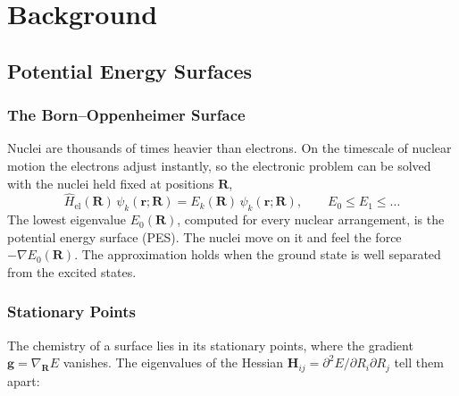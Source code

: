 %

\chapter{Background}
\label{ch:background}

\section{Potential Energy Surfaces}
\label{sec:background-pes}

\subsection{The Born--Oppenheimer Surface}
\label{sec:background-bo}

Nuclei are thousands of times heavier than electrons. On the timescale of
nuclear motion the electrons adjust instantly, so the electronic problem can
be solved with the nuclei held fixed at positions $\mathbf{R}$,
%
\begin{equation}
  \hat{H}_\text{el}(\mathbf{R})\, \psi_k(\mathbf{r};\mathbf{R})
  = E_k(\mathbf{R})\, \psi_k(\mathbf{r};\mathbf{R}),
  \qquad E_0 \le E_1 \le \dots
  \label{eq:electronic-schrodinger}
\end{equation}
%
The lowest eigenvalue $E_0(\mathbf{R})$, computed for every nuclear
arrangement, is the potential energy surface (PES). The nuclei move on it and
feel the force $-\nabla E_0(\mathbf{R})$. The approximation holds when the
ground state is well separated from the excited states.

\subsection{Stationary Points}
\label{sec:background-stationary}

The chemistry of a surface lies in its stationary points, where the gradient
$\mathbf{g} = \nabla_\mathbf{R} E$ vanishes. The eigenvalues of the Hessian
$\mathbf{H}_{ij} = \partial^2 E / \partial R_i \partial R_j$ tell them apart:

